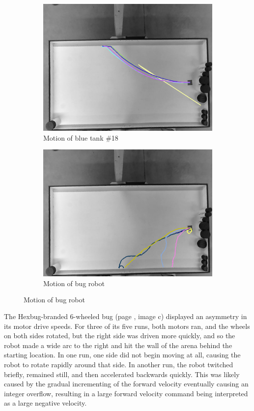\begin{figure}
\begin{subfigure}[t]{0.3\textwidth}
		\includegraphics[width=\textwidth]{../hardwareX_paper/robot_18.png}
		\caption{Motion of blue tank \#18}
	\end{subfigure}
	
	\begin{subfigure}[t]{0.3\textwidth}
		\includegraphics[width=\textwidth]{../hardwareX_paper/robot_5.png}
		\caption{Motion of bug robot}
	\end{subfigure}
	\label{img_traj}	
\end{figure}

The Hexbug-branded 6-wheeled bug (page \pageref{img_traj}, image c) displayed an asymmetry in its motor drive speeds. 
For three of its five runs, both motors ran, and the wheels on both sides rotated, but the right side was driven more quickly, and so the robot made a wide arc to the right and hit the wall of the arena behind the starting location. 
In one run, one side did not begin moving at all, causing the robot to rotate rapidly around that side. 
In another run, the robot twitched briefly, remained still, and then accelerated backwards quickly. 
This was likely caused by the gradual incrementing of the forward velocity eventually causing an integer overflow, resulting in a large forward velocity command being interpreted as a large negative velocity.

